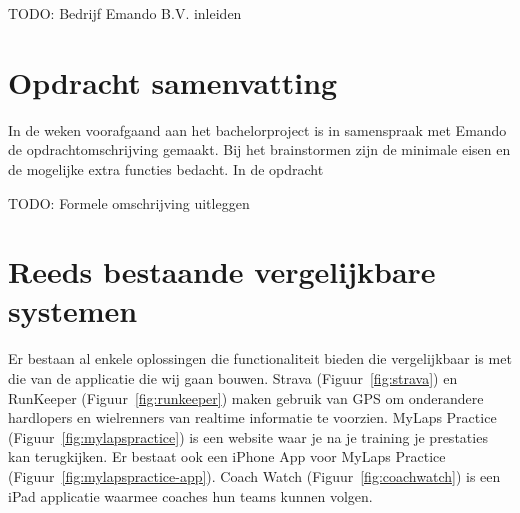 {\par \bigskip \par \color{red} TODO: Bedrijf Emando B.V. inleiden \par \bigskip \par }

\section{Opdracht samenvatting}
In de weken voorafgaand aan het bachelorproject is in samenspraak met Emando de opdrachtomschrijving gemaakt. Bij het brainstormen zijn de minimale eisen en de mogelijke extra functies bedacht. In de opdracht 



{\par \bigskip \par \color{red} TODO: Formele omschrijving uitleggen \par \bigskip \par }

\section{Reeds bestaande vergelijkbare systemen}

Er bestaan al enkele oplossingen die functionaliteit bieden die vergelijkbaar is met die van de applicatie die wij gaan bouwen. Strava (Figuur~\ref{fig:strava}) en RunKeeper (Figuur~\ref{fig:runkeeper}) maken gebruik van GPS om onderandere hardlopers en wielrenners van realtime informatie te voorzien. MyLaps Practice (Figuur~\ref{fig:mylapspractice}) is een website waar je na je training je prestaties kan terugkijken. Er bestaat ook een iPhone App voor MyLaps Practice (Figuur~\ref{fig:mylapspractice-app}). Coach Watch (Figuur~\ref{fig:coachwatch}) is een iPad applicatie waarmee coaches hun teams kunnen volgen.

